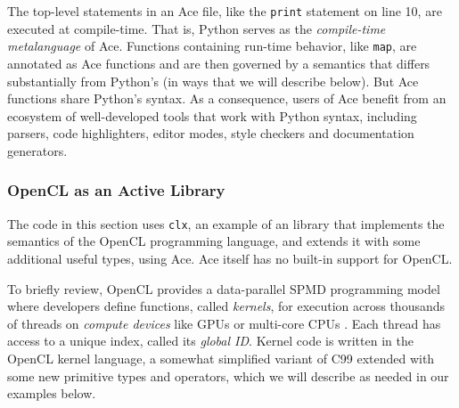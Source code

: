 The top-level statements in an Ace file, like the \verb|print| statement on line 10, are executed at compile-time. That is, Python serves as the \emph{compile-time metalanguage} of Ace. %
Functions containing run-time behavior, like \verb|map|, are annotated as Ace functions and are then governed by a semantics that differs substantially from Python's (in ways that we will describe below). But Ace functions share Python's syntax. As a consequence, users of Ace benefit from an ecosystem of well-developed tools that work with Python syntax, including parsers, code highlighters, editor modes, style checkers and documentation generators. 

\subsubsection{OpenCL as an Active Library}
The code in this section uses \verb|clx|, an example of an library that implements the semantics of the OpenCL programming language, and extends it with some additional useful types, using Ace. Ace itself has no built-in support for OpenCL.

To briefly review, OpenCL provides a data-parallel SPMD programming model where developers define functions, called {\em kernels}, for execution across thousands of threads on \emph{compute devices} like GPUs or multi-core CPUs \cite{opencl11}. Each thread has access to a unique index, called its \emph{global ID}. Kernel code is written in the OpenCL kernel language, a somewhat simplified variant of C99 extended with some new primitive types and operators, which we will describe as needed in our examples below.

